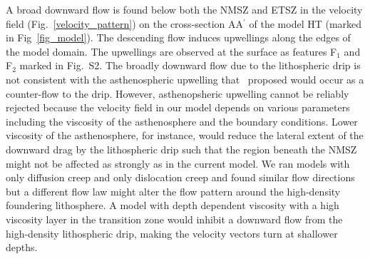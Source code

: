 \documentclass[draft,linenumbers]{agujournal2018}
\begin{document}
A broad downward flow is found below both the NMSZ and ETSZ in the velocity field (Fig.~\ref{velocity_pattern}) on the cross-section AA$^{\prime}$ of the model HT (marked in Fig~\ref{fig_model}). The descending flow induces upwellings along the edges of the model domain. The upwellings are observed at the surface as features F$_1$ and F$_2$ marked in Fig.~S2. The broadly downward flow due to the lithospheric drip is not consistent with the asthenospheric upwelling that~\citet{Biryol_2016} proposed would occur as a counter-flow to the drip. However, asthenopsheric upwelling cannot be reliably rejected because the velocity field in our model depends on various parameters including the viscosity of the asthenosphere and the boundary conditions. Lower viscosity of the asthenosphere, for instance, would reduce the lateral extent of the downward drag by the lithospheric drip such that the region beneath the NMSZ might not be affected as strongly as in the current model. We ran models with only diffusion creep and only dislocation creep and found similar flow directions  but a different flow law might alter the flow pattern around the high-density foundering lithosphere. A model with depth dependent viscosity with a high viscosity layer in the transition zone would inhibit a downward flow from the high-density lithospheric drip, making the velocity vectors turn at shallower depths.
\end{document}
